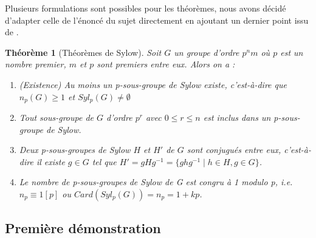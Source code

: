 \documentclass[french]{article}
\theoremstyle{definition}
\theoremstyle{plain}
\newtheorem{theorem}[subsubsection]{Théorème}
\theoremstyle{plain}
\theoremstyle{plain}
\theoremstyle{plain}
\theoremstyle{plain}
\begin{document}
Plusieurs formulations sont possibles pour les théorèmes, 
nous avons décidé d'adapter celle de l'énoncé du sujet directement en ajoutant un dernier point issu de \cite[p.~215]{chen2024napkin}.

\begin{theorem}[Théorèmes de Sylow]
	Soit \( G \) un groupe d'ordre \( p^{n}m \) où \( p \) est un nombre premier, \( m \) et \( p \) sont premiers entre eux. Alors on a :
	\begin{enumerate}[label={\upshape(\roman*)}]
		\item (Existence) Au moins un p-sous-groupe de Sylow existe, c'est-à-dire que \( n_{p}(G) \geq 1 \) et \( Syl_{p}(G) \neq \emptyset \)
		\item Tout sous-groupe de \( G \) d'ordre \( p^{r} \) avec \( 0 \leq r \leq n \) est inclus dans un p-sous-groupe de Sylow.
		\item Deux p-sous-groupes de Sylow \( H \) et \( H' \) de \( G \) sont conjugués entre eux, c'est-à-dire il existe \( g \in G \) tel que \( H' = gHg^{-1} = \{ ghg^{-1} \mid h \in H, g \in G \} \).
		\item Le nombre de p-sous-groupes de Sylow de G est congru à 1 modulo p, i.e. \( n_{p} \equiv 1 [p] \) ou \( Card(Syl_{p}({G})) = n_{p} = 1 + kp \).

	\end{enumerate}

\end{theorem}

\subsection{Première démonstration}
\end{document}

